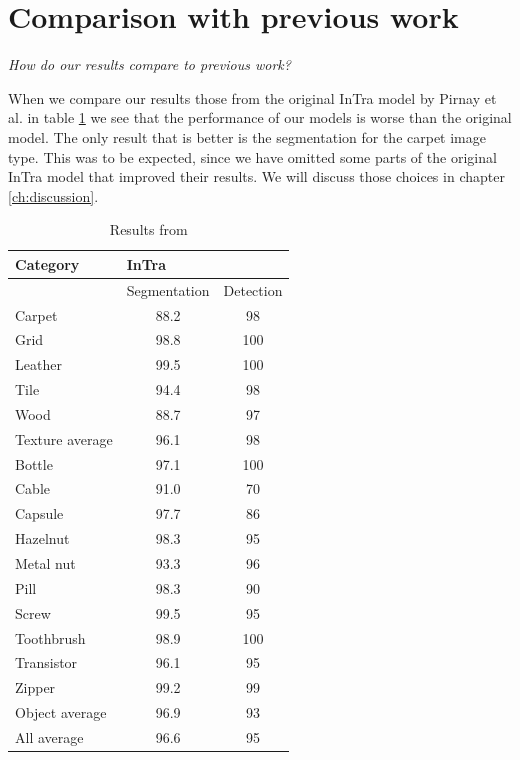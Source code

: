 \section{Comparison with previous work}

\textsl{How do our results compare to previous work?}

When we compare our results those from the original InTra model by Pirnay et al. \cite{pirnay_inpainting_2021} in table \ref{table:results:pirnay} we see that the performance of our models is worse than the original model. The only result that is better is the segmentation for the carpet image type. This was to be expected, since we have omitted some parts of the original InTra model that improved their results. We will discuss those choices in chapter \ref{ch:discussion}.

\begin{table}
\centering
\begin{tabular}{l|cc} 
\toprule
Category        & \multicolumn{2}{l}{InTra}    \\ 
\midrule
                & Segmentation & Detection    \\ 
\midrule
Carpet          & 88.2         & 98           \\
Grid            & 98.8         & 100          \\
Leather         & 99.5         & 100          \\
Tile            & 94.4         & 98           \\
Wood            & 88.7         & 97          \\ 
\midrule
Texture average & 96.1         & 98           \\ 
\midrule
Bottle          & 97.1         & 100          \\
Cable           & 91.0         & 70           \\
Capsule         & 97.7         & 86           \\
Hazelnut        & 98.3         & 95         \\
Metal nut       & 93.3         & 96          \\
Pill            & 98.3         & 90          \\
Screw           & 99.5         & 95          \\
Toothbrush      & 98.9         & 100         \\
Transistor      & 96.1         & 95          \\
Zipper          & 99.2         & 99          \\ 
\midrule
Object average  & 96.9         & 93          \\ 
\midrule
All average     & 96.6         & 95          \\
\bottomrule
\end{tabular}
\label{table:results:pirnay}
\caption{Results from \cite{pirnay_inpainting_2021}}
\end{table}

